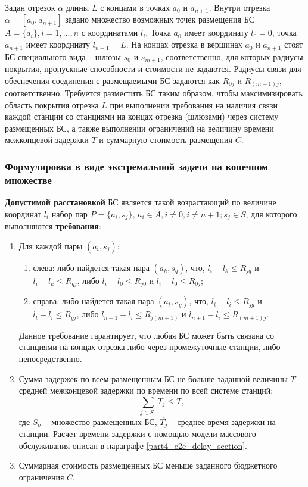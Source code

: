 Задан отрезок $\alpha$ длины $L$ с концами в точках $a_0$ и $a_{n+1}$. Внутри отрезка $\alpha = [a_0, a_{n+1}]$ задано множество возможных точек размещения БС $A=\{a_i \},i=1,...,n$ с координатами $l_i$. Точка $a_0$ имеет координату $l_0=0$, точка $a_{n+1}$ имеет координату $l_{n+1}=L$. На концах отрезка в вершинах $a_0$ и $a_{n+1}$ стоят БС специального вида -- шлюзы $s_0$ и $s_{m+1}$, соответственно, для которых радиусы покрытия, пропускные способности и стоимости не задаются. Радиусы связи для обеспечения соединения с размещаемыми БС задаются как $R_{0j}$ и $R_{(m+1)j}$, соответственно.
Требуется разместить БС таким образом, чтобы максимизировать область покрытия отрезка $L$ при выполнении требования на наличия связи каждой станции со станциями на концах отрезка (шлюзами) через систему размещенных БС, а также выполнении ограничений на величину времени межконцевой задержки $T$ и суммарную стоимость размещения $C$.


\subsubsection{Формулировка в виде экстремальной задачи на конечном множестве}

\textbf{Допустимой расстановкой} БС является такой возрастающий по величине координат $l_i$  набор пар $P = \{a_i, s_j\}, \, a_i \in A,i \neq 0,i \neq n+1;s_j \in S$, для которого выполняются \textbf{требования}:

\begin{enumerate}
  \item  Для каждой пары $(a_i,s_j)$:
      \begin{enumerate}
          \item слева: либо найдется такая пара $(a_k,s_q)$, что, $l_i - l_k \leqslant R_{jq}$  и $l_i - l_k  \leqslant R_{qj}$, либо $l_i-l_0 \leqslant R_{j0}$ и $l_i - l_0 \leqslant R_{0j}$;
          \item справа: либо найдется такая пара $(a_t,s_g)$, что, $l_t-l_i \leqslant R_{jg}$ и $l_t - l_i \leqslant R_{gj}$, либо $l_{n+1}-l_i \leqslant R_{j(m+1)}$ и $l_{n+1}-l_i \leqslant R_{(m+1)j}$. 
\end{enumerate}
Данное требование гарантирует, что любая БС может быть связана со станциями на концах отрезка либо через промежуточные станции, либо непосредственно.
  \item Сумма задержек по всем размещенным БС не больше заданной величины $T$ – средней межконцевой задержки по времени по всей системе станций:
  \begin{displaymath}
      \label{eq:part3_e2e_delay}
      \sum\limits_{j \in S_\sigma} \overline{T_j} \leqslant T,
  \end{displaymath}
где $S_\sigma$ – множество размещенных БС, $\overline{T_j}$ -- среднее время задержки на станции. Расчет времени задержки с помощью модели массового обслуживания описан в параграфе \cref{part4_e2e_delay_section}.
  \item Суммарная стоимость размещенных БС меньше заданного бюджетного ограничения  $C$.
\end{enumerate}


